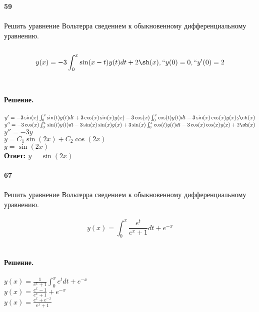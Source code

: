 \documentclass[10pt,a4paper]{article}
\begin{document}
	\noindent\textbf{59} \\ \\
	Решить уравнение Вольтерра сведением к обыкновенному дифференциальному уравнению.\\ \\
	$$y(x)=-3\int_0^x {\sin(x-t)y(t)dt} + 2\sh(x),``y(0)=0,``y'(0)=2$$ \\ \\ 
	\textbf{Решение.} \\ \\
	$y'=-3\sin(x) \int_0^x {\sin(t)y(t)dt}+3\cos(x)\sin(x)y(x)-3\cos(x)\int_0^x {\cos(t)y(t)dt}-3\sin(x)\cos(x)y(x)_2\ch(x)$\\
	$y'' = -3\cos(x)\int_0^x{\sin(t)y(t)dt}-3\sin(x)\sin(x)y(x)+3\sin(x)\int_0^x{\cos(t)y(t)dt}-3\cos(x)\cos(x)y(x)+2\sh(x)$\\
	$y''=-3y$\\
	$y=C_1\sin(2x)+C_2\cos(2x)$\\
	$y=\sin(2x)$\\
	\textbf{Ответ: $y=\sin(2x)$} \\ \\

	\noindent\textbf{67} \\ \\
	Решить уравнение Вольтерра сведением к обыкновенному дифференциальному уравнению.\\ \\
	$$y(x)=\int_{0}^{x}\frac{e^t}{e^x+1}dt+e^{-x}$$\\ \\ 
	\textbf{Решение.} \\ \\
	$y(x)=\frac{1}{e^x+1}\int_{0}^{x}e^tdt+e^{-x}$\\
	$y(x)=\frac{e^x-1}{e^x+1}+e^{-x}$\\
	$y(x)=\frac{e^x+e^{-x}}{e^x+1}$ \\ \\ 
\end{document}
